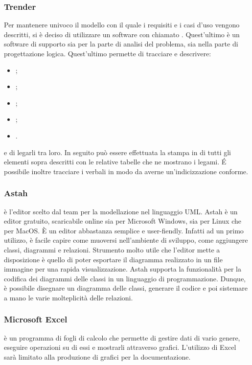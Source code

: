 \documentclass[../NormeDiProgetto.tex]{subfiles}
\begin{document}
			\subsubsection{Trender}
            Per mantenere univoco il modello con il quale i requisiti e i casi d'uso vengono descritti, si è deciso di utilizzare un software con  chiamato .
            Quest'ultimo è un software di supporto sia per la parte di analisi del problema, sia nella parte di progettazione logica.
            Quest'ultimo permette di tracciare e descrivere:
            \begin{itemize}
                  \item {};
                  \item {};
                  \item {};
                  \item {};
                  \item {}.
            \end{itemize}
            e di legarli tra loro. In seguito può essere effettuata la stampa in \gl{\LaTeX} di tutti gli elementi sopra descritti con le relative tabelle che ne mostrano i legami. É possibile inoltre tracciare i verbali in modo da averne un'indicizzazione conforme.

            \subsubsection{Astah}
             è l'editor scelto dal team per la modellazione nel linguaggio UML. Astah è un editor gratuito, scaricabile online sia per Microsoft Windows, sia per Linux che per MacOS. È un editor abbastanza semplice e user-fiendly. Infatti ad un primo utilizzo, è facile capire come muoversi nell'ambiente di sviluppo, come aggiungere classi, diagrammi e relazioni. Strumento molto utile che l'editor mette a disposizione è quello di poter esportare il diagramma realizzato in un file immagine per una rapida visualizzazione. Astah supporta la funzionalità per la codifica dei diagrammi delle classi in un linguaggio di programmazione. Dunque, è possibile disegnare un diagramma delle classi, generare il codice e poi sistemare a mano le varie molteplicità delle relazioni.

            \subsubsection{Microsoft Excel}
             è un programma di fogli di calcolo che permette di gestire dati di vario genere, eseguire operazioni su di essi e mostrarli attraverso grafici. L'utilizzo di Excel sarà limitato alla produzione di grafici per la documentazione.
            
\end{document}

